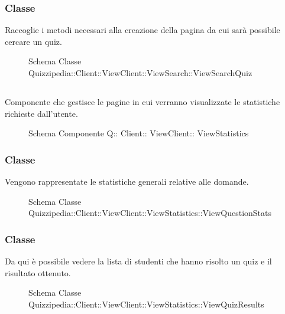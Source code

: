 \subsubsection{Classe }
Raccoglie i metodi necessari alla creazione della pagina da cui sarà possibile cercare un quiz.
\begin{figure}[H]
\centering
\noindent{}
\caption[Schema Classe ViewSearchQuiz]{Schema Classe Quizzipedia::Client::ViewClient::ViewSearch::ViewSearchQuiz}
\end{figure}
\subsection{}
Componente che gestisce le pagine in cui verranno visualizzate le statistiche richieste dall'utente.
\begin{figure}[H]
\centering
\noindent{}
\caption[Schema Componente Quizzipedia::Client::ViewClient::ViewStatistics]{Schema Componente Q:: Client:: ViewClient:: ViewStatistics}
\end{figure}
\subsubsection{Classe }
Vengono rappresentate le statistiche generali relative alle domande.
\begin{figure}[H]
\centering
\noindent{}
\caption[Schema Classe ViewQuestionStats]{Schema Classe Quizzipedia::Client::ViewClient::ViewStatistics::ViewQuestionStats}
\end{figure}
\subsubsection{Classe }
Da qui è possibile vedere la lista di studenti che hanno risolto un quiz e il risultato ottenuto.
\begin{figure}[H]
\centering
\noindent{}
\caption[Schema Classe ViewQuizResults]{Schema Classe Quizzipedia::Client::ViewClient::ViewStatistics::ViewQuizResults}
\end{figure}
